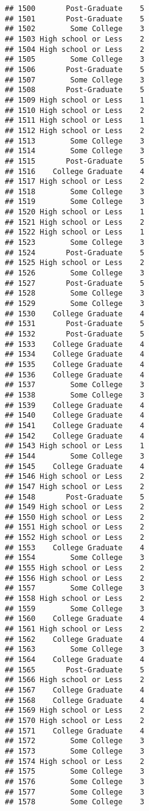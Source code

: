 \documentclass[
]{article}
\begin{document}
\begin{verbatim}
## 1500       Post-Graduate    5
## 1501       Post-Graduate    5
## 1502        Some College    3
## 1503 High school or Less    2
## 1504 High school or Less    2
## 1505        Some College    3
## 1506       Post-Graduate    5
## 1507        Some College    3
## 1508       Post-Graduate    5
## 1509 High school or Less    1
## 1510 High school or Less    2
## 1511 High school or Less    1
## 1512 High school or Less    2
## 1513        Some College    3
## 1514        Some College    3
## 1515       Post-Graduate    5
## 1516    College Graduate    4
## 1517 High school or Less    2
## 1518        Some College    3
## 1519        Some College    3
## 1520 High school or Less    1
## 1521 High school or Less    2
## 1522 High school or Less    1
## 1523        Some College    3
## 1524       Post-Graduate    5
## 1525 High school or Less    2
## 1526        Some College    3
## 1527       Post-Graduate    5
## 1528        Some College    3
## 1529        Some College    3
## 1530    College Graduate    4
## 1531       Post-Graduate    5
## 1532       Post-Graduate    5
## 1533    College Graduate    4
## 1534    College Graduate    4
## 1535    College Graduate    4
## 1536    College Graduate    4
## 1537        Some College    3
## 1538        Some College    3
## 1539    College Graduate    4
## 1540    College Graduate    4
## 1541    College Graduate    4
## 1542    College Graduate    4
## 1543 High school or Less    1
## 1544        Some College    3
## 1545    College Graduate    4
## 1546 High school or Less    2
## 1547 High school or Less    2
## 1548       Post-Graduate    5
## 1549 High school or Less    2
## 1550 High school or Less    2
## 1551 High school or Less    2
## 1552 High school or Less    2
## 1553    College Graduate    4
## 1554        Some College    3
## 1555 High school or Less    2
## 1556 High school or Less    2
## 1557        Some College    3
## 1558 High school or Less    2
## 1559        Some College    3
## 1560    College Graduate    4
## 1561 High school or Less    2
## 1562    College Graduate    4
## 1563        Some College    3
## 1564    College Graduate    4
## 1565       Post-Graduate    5
## 1566 High school or Less    2
## 1567    College Graduate    4
## 1568    College Graduate    4
## 1569 High school or Less    2
## 1570 High school or Less    2
## 1571    College Graduate    4
## 1572        Some College    3
## 1573        Some College    3
## 1574 High school or Less    2
## 1575        Some College    3
## 1576        Some College    3
## 1577        Some College    3
## 1578        Some College    3

\end{verbatim}
\end{document}
